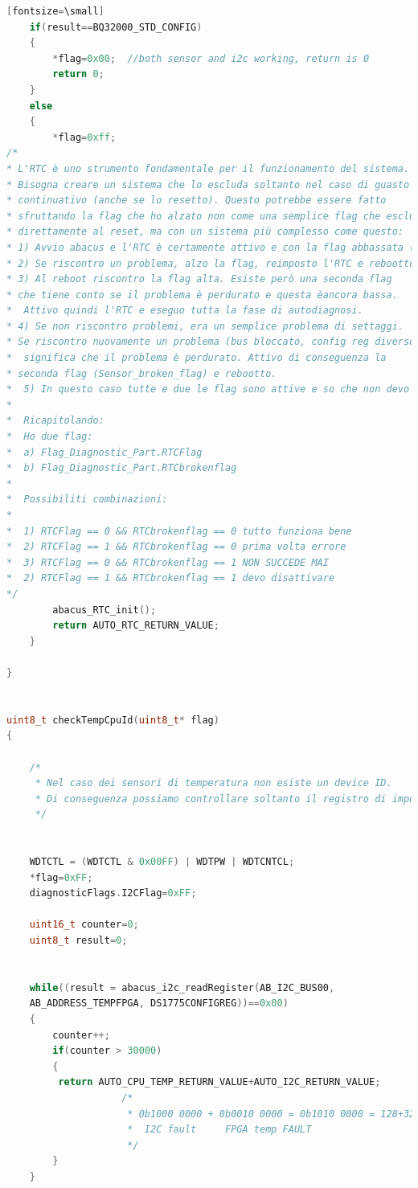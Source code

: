 \documentclass[LaM,binding=0.6cm]{../sapthesis}
\begin{document}
\begin{lstlisting}[language=c][fontsize=\small]
    if(result==BQ32000_STD_CONFIG)
    {
        *flag=0x00;  //both sensor and i2c working, return is 0
        return 0;
    }
    else
    {
        *flag=0xff;  
/*
* L'RTC è uno strumento fondamentale per il funzionamento del sistema. B
* Bisogna creare un sistema che lo escluda soltanto nel caso di guasto 
* continuativo (anche se lo resetto). Questo potrebbe essere fatto
* sfruttando la flag che ho alzato non come una semplice flag che esclude 
* direttamente al reset, ma con un sistema più complesso come questo:
* 1) Avvio abacus e l'RTC è certamente attivo e con la flag abbassata (a 0x0 )
* 2) Se riscontro un problema, alzo la flag, reimposto l'RTC e rebootto.
* 3) Al reboot riscontro la flag alta. Esiste però una seconda flag 
* che tiene conto se il problema è perdurato e questa èancora bassa.
*  Attivo quindi l'RTC e eseguo tutta la fase di autodiagnosi.
* 4) Se non riscontro problemi, era un semplice problema di settaggi. 
* Se riscontro nuovamente un problema (bus bloccato, config reg diverso)
*  significa che il problema è perdurato. Attivo di conseguenza la 
* seconda flag (Sensor_broken_flag) e rebootto.
*  5) In questo caso tutte e due le flag sono attive e so che non devo attivare l'RTC
*
*  Ricapitolando:
*  Ho due flag:
*  a) Flag_Diagnostic_Part.RTCFlag
*  b) Flag_Diagnostic_Part.RTCbrokenflag
*
*  Possibiliti combinazioni:
*
*  1) RTCFlag == 0 && RTCbrokenflag == 0 tutto funziona bene
*  2) RTCFlag == 1 && RTCbrokenflag == 0 prima volta errore
*  3) RTCFlag == 0 && RTCbrokenflag == 1 NON SUCCEDE MAI
*  2) RTCFlag == 1 && RTCbrokenflag == 1 devo disattivare
*/
        abacus_RTC_init();                 
        return AUTO_RTC_RETURN_VALUE;
    }

}


uint8_t checkTempCpuId(uint8_t* flag)
{

    /*
     * Nel caso dei sensori di temperatura non esiste un device ID. 
     * Di conseguenza possiamo controllare soltanto il registro di impostazione.
     */


    WDTCTL = (WDTCTL & 0x00FF) | WDTPW | WDTCNTCL;
    *flag=0xFF;
    diagnosticFlags.I2CFlag=0xFF;

    uint16_t counter=0;
    uint8_t result=0;


    while((result = abacus_i2c_readRegister(AB_I2C_BUS00, 
    AB_ADDRESS_TEMPFPGA, DS1775CONFIGREG))==0x00)
    {
        counter++;
        if(counter > 30000)             
        {
         return AUTO_CPU_TEMP_RETURN_VALUE+AUTO_I2C_RETURN_VALUE;
                    /*
                     * 0b1000 0000 + 0b0010 0000 = 0b1010 0000 = 128+32 = 160
                     *  I2C fault     FPGA temp FAULT
                     */
        }
    }
    

\end{lstlisting}
\end{document}
